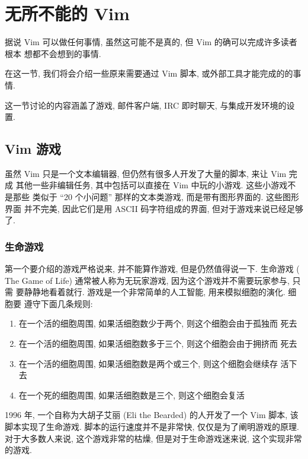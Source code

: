 \chapter{无所不能的 Vim}
\label{chap:vim_can_do_everything}

据说 Vim 可以做任何事情, 虽然这可能不是真的, 但 Vim 的确可以完成许多读者根本
想都不会想到的事情.

在这一节, 我们将会介绍一些原来需要通过 Vim 脚本, 或外部工具才能完成的的事情.

这一节讨论的内容涵盖了游戏, 邮件客户端, IRC 即时聊天, 与集成开发环境的设置.

\section{Vim 游戏}
\label{sec:vim_games}

虽然 Vim 只是一个文本编辑器, 但仍然有很多人开发了大量的脚本, 来让 Vim 完成
其他一些非编辑任务, 其中包括可以直接在 Vim 中玩的小游戏. 这些小游戏不是那些
类似于 ``20 个小问题'' 那样的文本类游戏, 而是带有图形界面的. 这些图形界面
并不完美, 因此它们是用 ASCII 码字符组成的界面, 但对于游戏来说已经足够了.

\subsection{生命游戏}
\label{subsec:game_of_life}

第一个要介绍的游戏严格说来, 并不能算作游戏, 但是仍然值得说一下. 生命游戏 (
The Game of Life) 通常被人称为无玩家游戏, 因为这个游戏并不需要玩家参与, 只需
要静静地看着就行. 游戏是一个非常简单的人工智能, 用来模拟细胞的演化. 细胞要
遵守下面几条规则:
\begin{enumerate}
	\item 在一个活的细胞周围, 如果活细胞数少于两个, 则这个细胞会由于孤独而
		死去
	\item 在一个活的细胞周围, 如果活细胞数多于三个, 则这个细胞会由于拥挤而
		死去
	\item 在一个活的细胞周围, 如果活细胞数是两个或三个, 则这个细胞会继续存
		活下去
	\item 在一个死的细胞周围, 如果活细胞数是三个, 则这个细胞会复活
\end{enumerate}

1996 年, 一个自称为大胡子艾丽 (Eli the Bearded) 的人开发了一个 Vim 脚本, 该
脚本实现了生命游戏. 脚本的运行速度并不是非常快, 仅仅是为了阐明游戏的原理.
对于大多数人来说, 这个游戏非常的枯燥, 但是对于生命游戏迷来说, 这个实现非常
的游戏.

